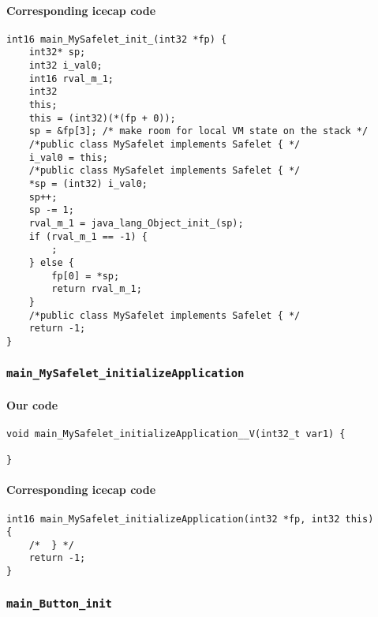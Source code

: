 \paragraph{Corresponding icecap code}\hfill
\begin{lstlisting}[firstnumber=56302]
int16 main_MySafelet_init_(int32 *fp) {
	int32* sp;
	int32 i_val0;
	int16 rval_m_1;
	int32
	this;
	this = (int32)(*(fp + 0));
	sp = &fp[3]; /* make room for local VM state on the stack */
	/*public class MySafelet implements Safelet { */
	i_val0 = this;
	/*public class MySafelet implements Safelet { */
	*sp = (int32) i_val0;
	sp++;
	sp -= 1;
	rval_m_1 = java_lang_Object_init_(sp);
	if (rval_m_1 == -1) {
		;
	} else {
		fp[0] = *sp;
		return rval_m_1;
	}
	/*public class MySafelet implements Safelet { */
	return -1;
}
\end{lstlisting}


\subsubsection{\texttt{main\_MySafelet\_initializeApplication}}

\paragraph{Our code}\hfill
\begin{lstlisting}[firstnumber=2162]
void main_MySafelet_initializeApplication__V(int32_t var1) {
	
}
\end{lstlisting}

\paragraph{Corresponding icecap code}\hfill
\begin{lstlisting}[firstnumber=56372]
int16 main_MySafelet_initializeApplication(int32 *fp, int32 this)
{
	/*	} */
	return -1;
}
\end{lstlisting}


\subsubsection{\texttt{main\_Button\_init}}

